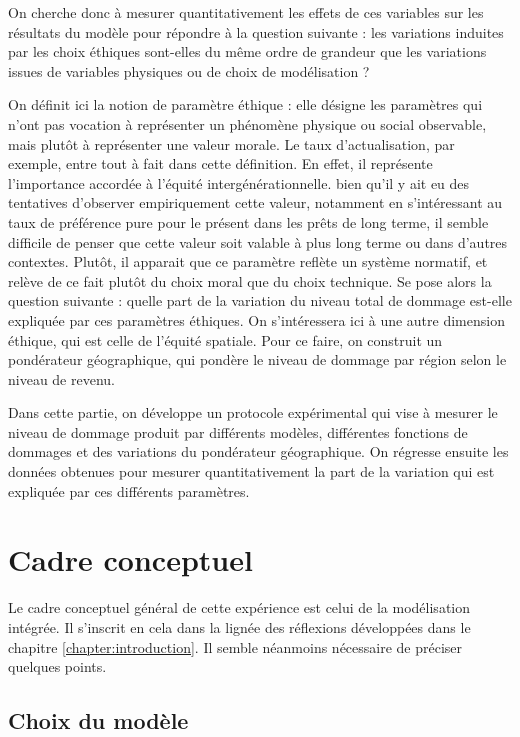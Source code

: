 On cherche donc à mesurer quantitativement les effets de ces variables sur les résultats du modèle pour répondre à la question suivante : les variations induites par les choix éthiques sont-elles du même ordre de grandeur que les variations issues de variables physiques ou de choix de modélisation ? 



On définit ici la notion de paramètre éthique : elle désigne les paramètres qui n'ont pas vocation à représenter un phénomène physique ou social observable, mais plutôt à représenter une valeur morale. Le taux d'actualisation, par exemple, entre tout à fait dans cette définition. En effet, il représente l'importance accordée à l'équité intergénérationnelle. bien qu'il y ait eu des tentatives d'observer empiriquement cette valeur, notamment en s'intéressant au taux de préférence pure pour le présent dans les prêts de long terme, il semble difficile de penser que cette valeur soit valable à plus long terme ou dans d'autres contextes. Plutôt, il apparait que ce paramètre reflète un système normatif, et relève de ce fait plutôt du choix moral que du choix technique. Se pose alors la question suivante : quelle part de la variation du niveau total de dommage est-elle expliquée par ces paramètres éthiques.  On s'intéressera ici à une autre dimension éthique, qui est celle de l'équité spatiale. Pour ce faire, on construit un pondérateur géographique, qui pondère le niveau de dommage par région selon le niveau de revenu.

Dans cette partie, on développe un protocole expérimental qui vise à mesurer le niveau de dommage produit par différents modèles, différentes fonctions de dommages et des variations du pondérateur géographique. On régresse ensuite les données obtenues pour mesurer quantitativement la part de la variation qui est expliquée par ces différents paramètres. 

\section{Cadre conceptuel}

Le cadre conceptuel général de cette expérience est celui de la modélisation intégrée. Il s'inscrit en cela dans la lignée des réflexions développées dans le chapitre \ref{chapter:introduction}. Il semble néanmoins nécessaire de préciser quelques points. \\

\subsection{Choix du modèle}

